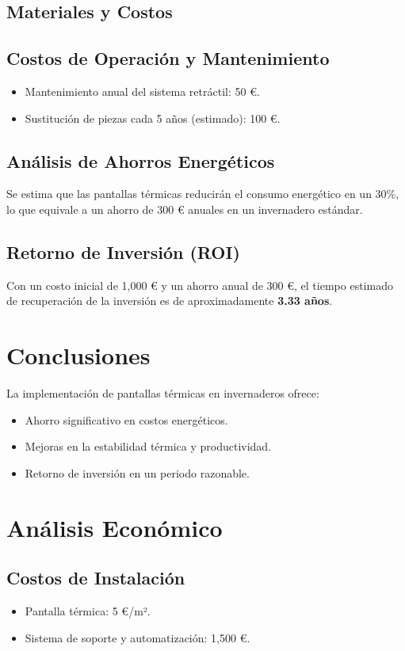 \begin{Form}
\subsection{Materiales y Costos}




\subsection{Costos de Operación y Mantenimiento}
\begin{itemize}
    \item Mantenimiento anual del sistema retráctil: 50 €.
    \item Sustitución de piezas cada 5 años (estimado): 100 €.
\end{itemize}

\subsection{Análisis de Ahorros Energéticos}
Se estima que las pantallas térmicas reducirán el consumo energético en un 30\%, lo que equivale a un ahorro de 300 € anuales en un invernadero estándar.

\subsection{Retorno de Inversión (ROI)}
Con un costo inicial de 1,000 € y un ahorro anual de 300 €, el tiempo estimado de recuperación de la inversión es de aproximadamente \textbf{3.33 años}.

\section{Conclusiones}
La implementación de pantallas térmicas en invernaderos ofrece:
\begin{itemize}
    \item Ahorro significativo en costos energéticos.
    \item Mejoras en la estabilidad térmica y productividad.
    \item Retorno de inversión en un periodo razonable.
\end{itemize}


\section{Análisis Económico}
\subsection{Costos de Instalación}
\begin{itemize}
    \item Pantalla térmica: 5 €/m².
    \item Sistema de soporte y automatización: 1,500 €.
\end{itemize}


\end{Form}

